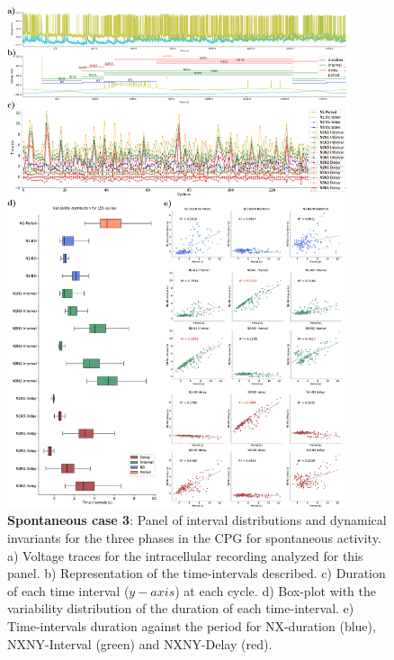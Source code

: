 \begin{figure}[htbp]
	\centering
	\includegraphics[width=0.9\textwidth]{./img/invariants/data/SUSSEX/prep1/images/3phases/panel_with_intervals.pdf}
	\caption{\textbf{Spontaneous case 3}: Panel of interval distributions and dynamical invariants for the three phases in the CPG for spontaneous activity. a) Voltage traces for the intracellular recording analyzed for this panel. b) Representation of the time-intervals described. c) Duration of each time interval ($y-axis$) at each cycle. d) Box-plot with the variability distribution of the duration of each time-interval. e) Time-intervals duration against the period for NX-duration (blue), NXNY-Interval (green) and NXNY-Delay (red).}
	\label{fig:prep1 invariants}
\end{figure}


